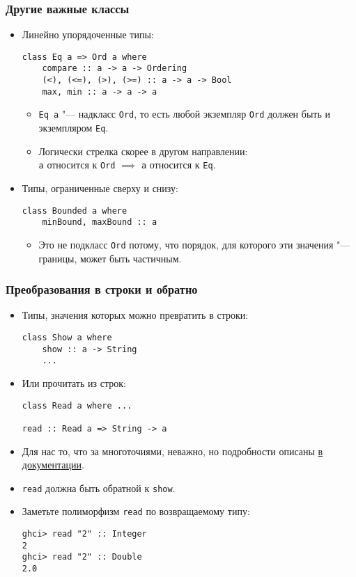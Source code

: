 \documentclass[10pt]{beamer}
\begin{document}
\begin{frame}[fragile]
\frametitle{Другие важные классы}
\begin{itemize}
\item 
Линейно упорядоченные типы:
\begin{lstlisting}
class Eq a => Ord a where
    compare :: a -> a -> Ordering
    (<), (<=), (>), (>=) :: a -> a -> Bool 
    max, min :: a -> a -> a
\end{lstlisting}
    \begin{itemize}
    \item \lstinline|Eq a| "--- надкласс \lstinline|Ord|, то есть любой экземпляр \lstinline|Ord| должен быть и экземпляром \lstinline|Eq|. \pause
    \item Логически стрелка скорее в другом направлении:\\ \lstinline|a| относится к \lstinline|Ord| $\implies$ \lstinline|a| относится к \lstinline|Eq|.
    \end{itemize}
\pause
\item 
Типы, ограниченные сверху и снизу:
\begin{lstlisting}
class Bounded a where
    minBound, maxBound :: a 
\end{lstlisting}
    \begin{itemize}
    \item Это не подкласс \lstinline|Ord| потому, что порядок, для которого эти значения "--- границы, может быть частичным.
    \end{itemize}
\end{itemize}
\end{frame}

\begin{frame}[fragile]
\frametitle{Преобразования в строки и обратно}
\begin{itemize}
    \item 
    Типы, значения которых можно превратить в строки:
\begin{lstlisting}[basicstyle=\ttfamily\small]
class Show a where
    show :: a -> String 
    ...
\end{lstlisting}\pause
\item Или прочитать из строк:
\begin{lstlisting}[basicstyle=\ttfamily\small]
class Read a where ...

read :: Read a => String -> a
\end{lstlisting}\pause
    \item Для нас то, что за многоточиями, неважно, но подробности описаны \href{http://hackage.haskell.org/package/base-4.10.1.0/docs/Prelude.html#g:22}{в документации}.\pause
    \item \lstinline|read| должна быть обратной к \lstinline|show|.
    \item Заметьте полиморфизм \lstinline|read| по возвращаемому типу:
\begin{lstlisting}[basicstyle=\ttfamily\small]
ghci> read "2" :: Integer
2
ghci> read "2" :: Double
2.0
\end{lstlisting}
\end{itemize}
\end{frame}
\end{document}
